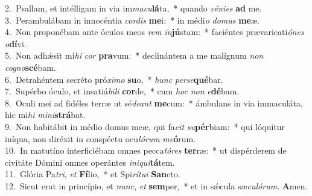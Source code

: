 {2.~}Psallam, et intélligam in via im\textit{ma}\textit{cu}\textbf{lá}ta,~* quando \textit{vé}\textit{ni}\textit{es} \textbf{ad} me.\\
{3.~}Perambulábam in innocéntia \textit{cor}\textit{dis} \textbf{me}i:~* in médi\textit{o} \textit{do}\textit{mus} \textbf{me}æ.\\
{4.~}Non proponébam ante óculos meos \textit{rem} \textit{in}\textbf{jú}stam:~* faciéntes prævaricati\textit{ó}\textit{nes} \textit{o}\textbf{dí}vi.\\
{5.~}Non adhǽsit mi\textit{hi} \textit{cor} \textbf{pra}vum:~* declinántem a me malígnum \textit{non} \textit{co}\textit{gno}\textbf{scé}bam.\\
{6.~}Detrahéntem secréto pró\textit{xi}\textit{mo} \textbf{su}o,~* \textit{hunc} \textit{per}\textit{se}\textbf{qué}bar.\\
{7.~}Supérbo óculo, et insatiá\textit{bi}\textit{li} \textbf{cor}de,~* cum \textit{hoc} \textit{non} \textit{e}\textbf{dé}bam.\\
{8.~}Oculi mei ad fidéles terræ ut sé\textit{de}\textit{ant} \textbf{me}cum:~* ámbulans in via immaculáta, hic mi\textit{hi} \textit{mi}\textit{ni}\textbf{strá}bat.\\
{9.~}Non habitábit in médio domus meæ, qui fa\textit{cit} \textit{su}\textbf{pér}biam:~* qui lóquitur iníqua, non diréxit in conspéctu ocu\textit{ló}\textit{rum} \textit{me}\textbf{ó}rum.\\
{10.~}In matutíno interficiébam omnes pecca\textit{tó}\textit{res} \textbf{ter}ræ:~* ut dispérderem de civitáte Dómini omnes operántes \textit{i}\textit{ni}\textit{qui}\textbf{tá}tem.\\
{11.~}Glória Pa\textit{tri}, \textit{et} \textbf{Fí}lio,~* et Spi\textit{rí}\textit{tu}\textit{i} \textbf{San}cto.\\
{12.~}Sicut erat in princípio, et \textit{nunc}, \textit{et} \textbf{sem}per,~* et in sǽcula sæ\textit{cu}\textit{ló}\textit{rum}. \textbf{A}men.\\
